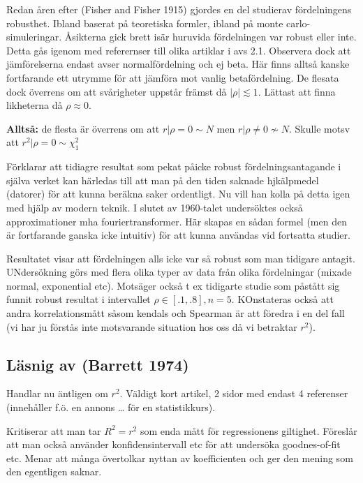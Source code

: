 \documentclass[]{article}
\begin{document}
Redan åren efter (Fisher and Fisher 1915) gjordes en del studierav
fördelningens robusthet. Ibland baserat på teoretiska formler, ibland på
monte carlo-simuleringar. Åsikterna gick brett isär huruvida
fördelningen var robust eller inte. Detta gås igenom med referernser
till olika artiklar i avs 2.1. Observera dock att jämförelserna endast
avser normalfördelning och ej beta. Här finns alltså kanske fortfarande
ett utrymme för att jämföra mot vanlig betafördelning. De flesata dock
överrens om att svårigheter uppstår främst då \(|\rho| \lesssim 1\).
Lättast att finna likheterna då \(\rho \approx 0\).

\textbf{Alltså:} de flesta är överrens om att \(r|\rho=0 \sim N\) men
\(r|\rho \neq 0 \nsim N\). Skulle motsv att \(r^2|\rho=0 \sim \chi^2_1\)

Förklarar att tidiagre resultat som pekat påicke robust
fördelningsantagande i själva verket kan härledas till att man på den
tiden saknade hjkälpmedel (datorer) för att kunna beräkna saker
ordentligt. Nu vill han kolla på detta igen med hjälp av modern teknik.
I slutet av 1960-talet undersöktes också approximationer mha
fouriertransformer. Här skapas en sådan formel (men den är fortfarande
ganska icke intuitiv) för att kunna användas vid fortsatta studier.

Resultatet visar att fördelningen alls icke var så robust som man
tidigare antagit. UNdersökning görs med flera olika typer av data från
olika fördelningar (mixade normal, exponential etc). Motsäger också t ex
tidigarte studie som påstått sig funnit robust resultat i intervallet
\(\rho \in [.1, .8], n = 5\). KOnstateras också att andra
korrelationsmått såsom kendals och Spearman är att föredra i en del fall
(vi har ju förstås inte motsvarande situation hos oss då vi betraktar
\(r^2\)).

\subsection{Läsnig av (Barrett 1974)}\label{lasnig-av-barrett1974}

Handlar nu äntligen om \(r^2\). Väldigt kort artikel, 2 sidor med endast
4 referenser (innehåller f.ö. en annons \ldots{} för en statistikkurs).

Kritiserar att man tar \(R^2 = r^2\) som enda mått för regressionens
giltighet. Föreslår att man också använder konfidensintervall etc för
att undersöka goodnes-of-fit etc. Menar att många övertolkar nyttan av
koefficienten och ger den mening som den egentligen saknar.
\end{document}
